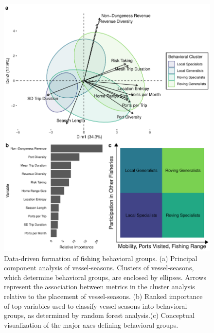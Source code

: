 \documentclass[]{elsarticle} %
\begin{document}
\begin{figure}%
\includegraphics[width=\linewidth]{fig_pca_rf.pdf}
\caption{Data-driven formation of fishing behavioral groups. (a) Principal component analysis of vessel-seasons. Clusters of vessel-seasons, which determine behavioral groups, are enclosed by ellipses. Arrows represent the association between metrics in the cluster analysis relative to the placement of vessel-seasons. (b) Ranked importance of top variables used to classify vessel-seasons into behavioral groups, as determined by random forest analysis.(c) Conceptual visualization of the major axes defining behavioral groups.}
\label{fig:pca}
\end{figure}
\end{document}

